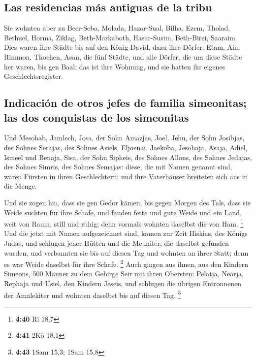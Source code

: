 \hypertarget{las-residencias-muxe1s-antiguas-de-la-tribu}{%
\subsection{Las residencias más antiguas de la
tribu}\label{las-residencias-muxe1s-antiguas-de-la-tribu}}

 Sie wohnten aber zu Beer-Seba, Molada, Hazar-Sual,
 Bilha, Ezem, Tholad,  Bethuel, Horma,
Ziklag,  Beth-Markaboth, Hasar-Susim, Beth-Birei,
Saaraim. Dies waren ihre Städte bis auf den König David, dazu ihre
Dörfer.  Etam, Ain, Rimmon, Thochen, Asan, die fünf
Städte,  und alle Dörfer, die um diese Städte her waren,
bis gen Baal; das ist ihre Wohnung, und sie hatten ihr eigenes
Geschlechtsregister.

\hypertarget{indicaciuxf3n-de-otros-jefes-de-familia-simeonitas-las-dos-conquistas-de-los-simeonitas}{%
\subsection{Indicación de otros jefes de familia simeonitas; las dos
conquistas de los
simeonitas}\label{indicaciuxf3n-de-otros-jefes-de-familia-simeonitas-las-dos-conquistas-de-los-simeonitas}}

 Und Mesobab, Jamlech, Josa, der Sohn Amazjas,
 Joel, Jehu, der Sohn Josibjas, des Sohnes Serajas, des
Sohnes Asiels,  Eljoenai, Jaekoba, Jesohaja, Asaja,
Adiel, Ismeel und Benaja,  Sisa, der Sohn Sipheis, des
Sohnes Allons, des Sohnes Jedajas, des Sohnes Simris, des Sohnes
Semajas:  diese, die mit Namen genannt sind, waren
Fürsten in ihren Geschlechtern; und ihre Vaterhäuser breiteten sich aus
in die Menge.

 Und sie zogen hin, dass sie gen Gedor kämen, bis gegen
Morgen des Tals, dass sie Weide suchten für ihre Schafe, 
und fanden fette und gute Weide und ein Land, weit von Raum, still und
ruhig; denn vormals wohnten daselbst die von Ham. \footnote{\textbf{4:40}
  Ri 18,7}  Und die jetzt mit Namen aufgezeichnet sind,
kamen zur Zeit Hiskias, des Königs Judas, und schlugen jener Hütten und
die Meuniter, die daselbst gefunden wurden, und verbannten sie bis auf
diesen Tag und wohnten an ihrer Statt; denn es war Weide daselbst für
ihre Schafe. \footnote{\textbf{4:41} 2Kö 18,1}  Auch
gingen aus ihnen, aus den Kindern Simeons, 500 Männer zu dem Gebirge
Seir mit ihren Obersten: Pelatja, Nearja, Rephaja und Usiel, den Kindern
Jeseis,  und schlugen die übrigen Entronnenen der
Amalekiter und wohnten daselbst bis auf diesen Tag. \footnote{\textbf{4:43}
  1Sam 15,3; 1Sam 15,8}

